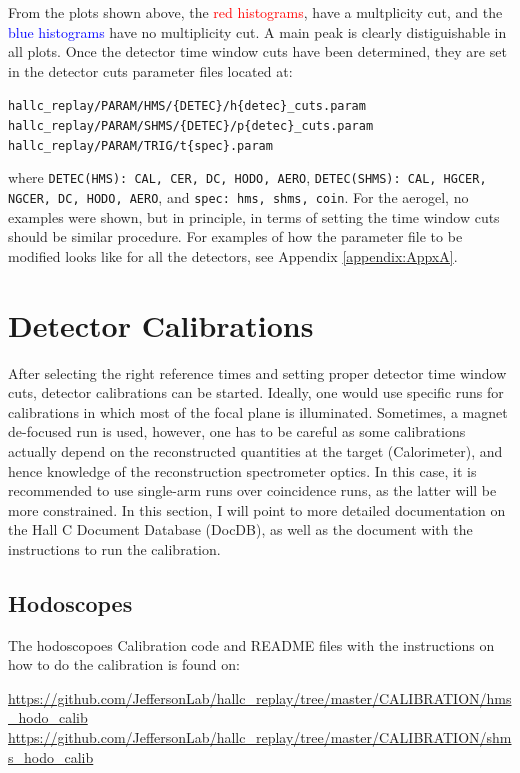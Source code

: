 \documentclass[14pt]{article}
\begin{document}
\noindent From the plots shown above, the \textcolor{red}{red histograms}, have a multplicity cut, and the \textcolor{blue}{blue histograms} have no multiplicity cut. A main
peak is clearly distiguishable in all plots. 
Once the detector time window cuts have been determined, they are set in the detector cuts parameter files located at:
\begin{flushleft}
  \texttt{hallc\_replay/PARAM/HMS/\{DETEC\}/h\{detec\}\_cuts.param} \\
  \texttt{hallc\_replay/PARAM/SHMS/\{DETEC\}/p\{detec\}\_cuts.param} \\
  \texttt{hallc\_replay/PARAM/TRIG/t\{spec\}.param} 
\end{flushleft}
where \texttt{DETEC(HMS): CAL, CER, DC, HODO, AERO}, \texttt{DETEC(SHMS): CAL, HGCER, NGCER, DC, HODO, AERO}, and
\texttt{spec: hms, shms, coin}.
For the aerogel, no examples were shown, but in principle, in terms of setting the time window cuts should be similar procedure.
For examples of how the parameter file to be modified looks like for all the detectors, see Appendix \ref{appendix:AppxA}.

\newpage
\section{Detector Calibrations}
After selecting the right reference times and setting proper detector time window cuts, detector calibrations can be started. Ideally, one would
use specific runs for calibrations in which most of the focal plane is illuminated. Sometimes, a magnet de-focused run is used, however, one has to be
careful as some calibrations actually depend on the reconstructed quantities at the target (Calorimeter), and hence knowledge of the reconstruction
spectrometer optics. In this case, it is recommended to use single-arm runs over coincidence runs, as the latter will be more constrained. In this section,
I will point to more detailed documentation on the Hall C Document Database (DocDB), as well as the document with the instructions to run the calibration.

\subsection{Hodoscopes}
The hodoscopoes Calibration code and README files with the instructions on how to do the calibration is found on:
\begin{center}
  \url{https://github.com/JeffersonLab/hallc_replay/tree/master/CALIBRATION/hms_hodo_calib} \\
   \url{ https://github.com/JeffersonLab/hallc_replay/tree/master/CALIBRATION/shms_hodo_calib}
\end{center}
\end{document}
